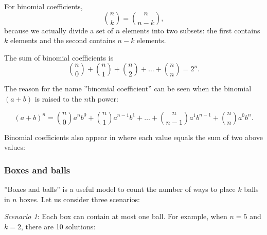 For binomial coefficients,
\[
\binom{n}{k} = \binom{n}{n-k},
\]
because we actually divide a set of $n$ elements into
two subsets: the first contains $k$ elements
and the second contains $n-k$ elements.

The sum of binomial coefficients is
\[
\binom{n}{0} + \binom{n}{1} + \binom{n}{2} + \ldots + \binom{n}{n} = 2^n.
\]

The reason for the name ''binomial coefficient''
can be seen when the binomial $(a+b)$ is raised to
the $n$th power:

\[ (a+b)^n =
\binom{n}{0} a^n b^0 + 
\binom{n}{1} a^{n-1} b^1 +
\ldots + 
\binom{n}{n-1} a^1 b^{n-1} +
\binom{n}{n} a^0 b^n. \]


Binomial coefficients also appear in
where each value equals the sum of two
above values:
\begin{center}
\end{center}

\subsubsection{Boxes and balls}

''Boxes and balls'' is a useful model
to count the number of ways to
place $k$ balls in $n$ boxes.
Let us consider three scenarios:

\textit{Scenario 1}: Each box can contain
at most one ball.
For example, when $n=5$ and $k=2$,
there are 10 solutions:

\begin{center}
\end{center}

